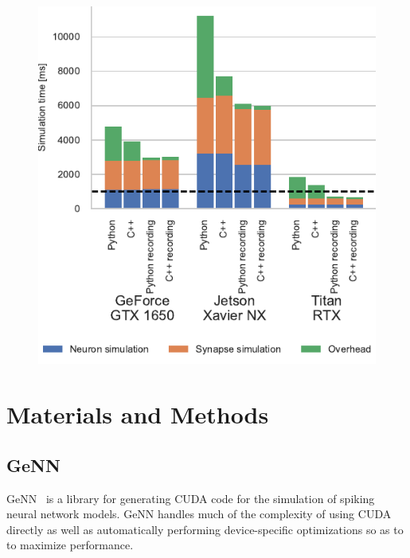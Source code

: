 \documentclass[utf8]{frontiersSCNS} %
\begin{document}
\begin{figure}[h!]
    \begin{center}
        \includegraphics{figures/microcircuit_overheads.pdf}
    \end{center}
    \caption{}\label{fig:microcircuit_overheads}
\end{figure}

\section{Materials and Methods}
\subsection{GeNN}
GeNN~\citep{Yavuz2016} is a library for generating CUDA code for the simulation of spiking neural network models.
GeNN handles much of the complexity of using CUDA directly as well as automatically performing device-specific optimizations so as to to maximize performance.
\end{document}
